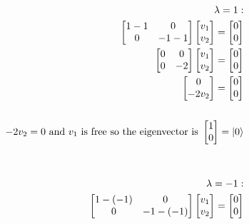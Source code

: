 \documentclass{article}
\begin{document}
\begin{align*}
    \begin{split}
        \lambda = 1: \\
        \begin{bmatrix}
            1 - 1  & 0 \\
            0 & -1 - 1
        \end{bmatrix} \begin{bmatrix} v_1 \\ v_2 \end{bmatrix} = \begin{bmatrix} 0 \\ 0 \end{bmatrix} \\
        \begin{bmatrix}
            0 & 0 \\
            0 & -2
        \end{bmatrix} \begin{bmatrix} v_1 \\ v_2 \end{bmatrix} = \begin{bmatrix} 0 \\ 0 \end{bmatrix} \\
        \begin{bmatrix} 0 \\ -2v_2 \end{bmatrix} = \begin{bmatrix} 0 \\ 0 \end{bmatrix} \\\\
        -2v_2 = 0 \text{ and } v_1 \text{ is free so the eigenvector is } \begin{bmatrix} 1 \\ 0 \end{bmatrix} = \ket{0} \\\\\\
        \lambda = -1: \\
        \begin{bmatrix}
            1 - (-1)  & 0 \\
            0 & -1 - (-1)
        \end{bmatrix} \begin{bmatrix} v_1 \\ v_2 \end{bmatrix} = \begin{bmatrix} 0 \\ 0 \end{bmatrix} \\

\end{split}
\end{align*}
\end{document}
